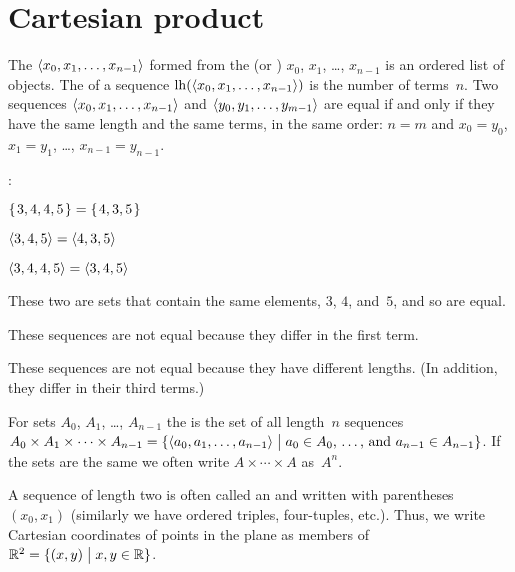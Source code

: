 \documentclass{test}  %
\begin{document}
\section{Cartesian product}

\begin{df}
The  $\langle x_0, x_1, \ldots, x_{n-1}\rangle$
formed from the  
(or ) $x_0$, $x_1$, \ldots, $x_{n-1}$ 
is an ordered list of objects.
The  of a sequence $\operatorname*{lh}(\langle x_0, x_1, \ldots, x_{n-1}\rangle)$
is the number of terms~$n$.
Two sequences $\langle x_0, x_1, \ldots, x_{n-1}\rangle$ and
$\langle y_0, y_1, \ldots, y_{m-1}\rangle$ are equal if and only if
they have the same length and
the same terms, in the same order:
$n=m$ and
$x_0=y_0$, $x_1=y_1$, \ldots, $x_{n-1}=y_{n-1}$. 
\end{df}

\begin{problem}\pord:
\begin{items}
\item $\mbox{$\{\hspace{0.1em}3, 4, 4, 5\hspace{0.1em}\}$}=\mbox{$\{\hspace{0.1em}4, 3, 5\hspace{0.1em}\}$}$
\item $\langle3, 4, 5\rangle=\langle4, 3, 5\rangle$
\item $\langle3, 4, 4, 5\rangle=\langle3,4,5\rangle$  
\end{items}
\begin{answer}
\begin{items}
\item These two are sets that contain the same elements, $3$, $4$, and~$5$,
  and so are equal.
\item These sequences are not equal because they differ in the first term.
\item These sequences are not equal because they have different lengths.
  (In addition, they differ in their third terms.)
\end{items}
\end{answer}
\end{problem}

\begin{df}
For sets $A_0$, $A_1$, \ldots, $A_{n-1}$
the  
is the set of all length~$n$ sequences
$A_0\times A_1\times \cdots \times A_{n-1}
  =\{\langle a_0,a_1,\ldots,a_{n-1}\rangle \bigm| \text{$a_0\in A_0$, \ldots, and~$a_{n-1}\in A_{n-1}$}\}$.
If the sets are the same we often write $A\times\cdots\times A$ 
as~$A^n$.
\end{df}

A sequence of length two is often called an  and 
written with parentheses $(x_0,x_1)$
(similarly we have ordered triples, four-tuples, etc.).
Thus, we write 
Cartesian coordinates of points in the plane as members of
$\mathbb{R}^2=\{(x,y) \bigm| x,y\in\mathbb{R}\}$.
\end{document}
